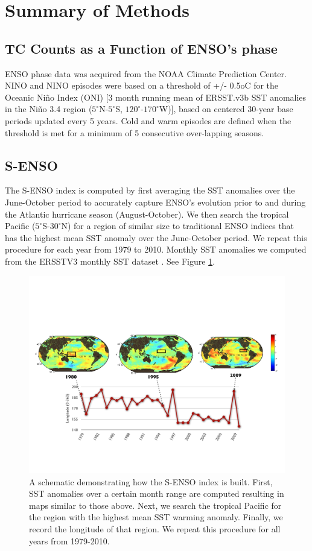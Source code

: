 \section{Summary of Methods}
\subsection{TC Counts as a Function of ENSO's phase}
ENSO phase data was acquired from the NOAA Climate Prediction Center. NINO and NINO episodes were based on a threshold of +/- 0.5oC for the Oceanic Ni\~{n}o Index (ONI) [3 month running mean of ERSST.v3b SST anomalies in the Ni\~{n}o 3.4 region ($5^\circ$N-$5^\circ$S, $120^\circ$-$170^\circ$W)], based on centered 30-year base periods updated every 5 years. Cold and warm episodes are defined when the threshold is met for a minimum of 5 consecutive over-lapping seasons.

\subsection{S-ENSO}
The S-ENSO index is computed by first averaging the SST anomalies over the June-October period to accurately capture ENSO's evolution prior to and during the Atlantic hurricane season (August-October). We then search the tropical Pacific ($5^\circ$S-$30^\circ$N) for a region of similar size to traditional ENSO indices that has the highest mean SST anomaly over the June-October period. We repeat this procedure for each year from 1979 to 2010. Monthly SST anomalies we computed from the ERSSTV3 monthly SST dataset \cite{reynolds2002}. See Figure \ref{fig:s_enso_graphic}.

\begin{figure}[htbp]
	\centering
		\includegraphics[width=5in]{figures/s_enso_graphic.pdf}
	\caption{A schematic demonstrating how the S-ENSO index is built. First, SST anomalies over a certain month range are computed resulting in maps similar to those above. Next, we search the tropical Pacific for the region with the highest mean SST warming anomaly. Finally, we record the longitude of that region. We repeat this procedure for all years from 1979-2010. }
	\label{fig:s_enso_graphic}
\end{figure}

